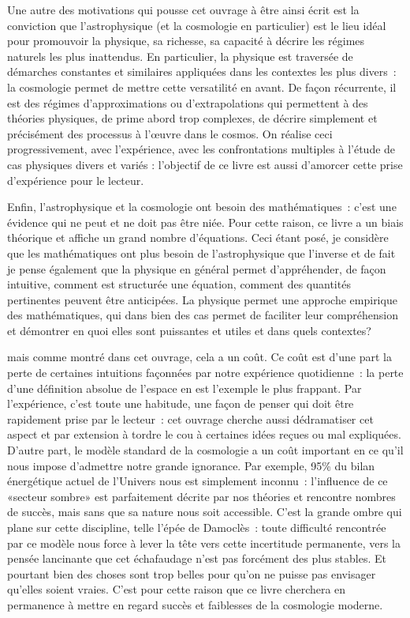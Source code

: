 Une autre des motivations qui pousse cet ouvrage à être ainsi écrit est la conviction que l'astrophysique (et la cosmologie en particulier) est le lieu idéal pour promouvoir la physique, sa richesse, sa capacité à décrire les régimes naturels les plus inattendus. En particulier, la physique est traversée de démarches constantes et similaires appliquées dans les contextes les plus divers~: la cosmologie permet de mettre cette versatilité en avant. De façon récurrente, il est des régimes d'approximations ou d'extrapolations qui permettent à des théories physiques, de prime abord trop complexes, de décrire simplement et précisément des processus à l'œuvre dans le cosmos. On réalise ceci progressivement, avec l'expérience, avec les confrontations multiples à l'étude de cas physiques divers et variés : l'objectif de ce livre est aussi d'amorcer cette prise d'expérience pour le lecteur.

Enfin, l'astrophysique et la cosmologie ont besoin des mathématiques~: c'est une évidence qui ne peut et ne doit pas être niée. Pour cette raison, ce livre a un biais théorique et affiche un grand nombre d'équations. Ceci étant posé, je considère que les mathématiques ont plus besoin de l'astrophysique que l'inverse et de fait je pense également que la physique en général permet d'appréhender, de façon intuitive, comment est structurée une équation, comment des quantités pertinentes peuvent être anticipées. La physique permet une approche empirique des mathématiques, qui dans bien des cas permet de faciliter leur compréhension et démontrer en quoi elles sont puissantes et utiles et dans quels contextes?

 mais comme montré dans cet ouvrage, cela a un coût. Ce coût est d'une part la perte de certaines intuitions façonnées par notre expérience quotidienne~: la perte d'une définition absolue de l'espace en est l'exemple le plus frappant. Par l'expérience, c'est toute une habitude, une façon de penser qui doit être rapidement prise par le lecteur~: cet ouvrage cherche aussi dédramatiser cet aspect et par extension à tordre le cou à certaines idées reçues ou mal expliquées. D'autre part, le modèle standard de la cosmologie a un coût important en ce qu'il nous impose d'admettre notre grande ignorance. Par exemple, 95\% du bilan énergétique actuel de l'Univers nous est simplement inconnu~: l'influence de ce «secteur sombre» est parfaitement décrite par nos théories et rencontre nombres de succès, mais sans que sa nature nous soit accessible. C'est la grande ombre qui plane sur cette discipline, telle l'épée de Damoclès~: toute difficulté rencontrée par ce modèle nous force à lever la tête vers cette incertitude permanente, vers la pensée lancinante que cet échafaudage n'est pas forcément des plus stables. Et pourtant bien des choses sont trop belles pour qu'on ne puisse pas envisager qu'elles soient vraies. C'est pour cette raison que ce livre cherchera en permanence à mettre en regard succès et faiblesses de la cosmologie moderne.

